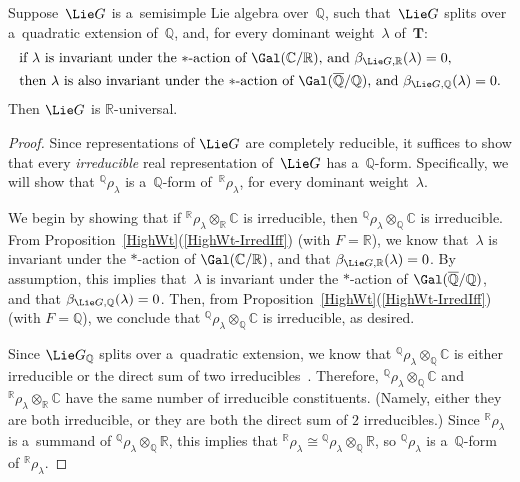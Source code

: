 \begin{cor}
Suppose~$\Lie G$ is a~semisimple Lie algebra over~$\mathbb{Q}$, such that~$\Lie G$ splits over a~quadratic
extension of~$\mathbb{Q}$, and, for every dominant weight~$\lambda$ of~$\mathbf{T}$:
\begin{gather}
\begin{split}
& \text{if~$\lambda$ is invariant under the $*$-action of~$\Gal(\mathbb{C}/\mathbb{R})$, and $\beta_{\Lie G,\mathbb{R}}(\lambda) = 0$,}
\\
& \text{then~$\lambda$ is also invariant under the $*$-action of $\Gal(\overline{\mathbb{Q}}/\mathbb{Q})$, and
$\beta_{\Lie G,\mathbb{Q}}(\lambda) = 0$.}
\end{split}\label{SplitOverQuadIff-weight}
\end{gather}
Then $\Lie G$ is $\mathbb{R}$-universal.
\end{cor}

\begin{proof}
Since representations of $\Lie G$ are completely reducible, it suf\/f\/ices to show that every \emph{irreducible} real
representation of~$\Lie G$ has a~$\mathbb{Q}$-form.
Specif\/ically, we will show that ${}^\mathbb{Q} \rho_\lambda$ is a~$\mathbb{Q}$-form of~${}^\mathbb{R} \rho_\lambda$, for
every dominant weight~$\lambda$.

We begin by showing that if ${}^\mathbb{R} \rho_\lambda \otimes_\mathbb{R} \mathbb{C}$ is irreducible, then
${}^\mathbb{Q} \rho_\lambda \otimes_\mathbb{Q} \mathbb{C}$ is irreducible.
From Proposition~\ref{HighWt}(\ref{HighWt-IrredIff}) (with $F = \mathbb{R}$), we know that~$\lambda$ is invariant under the $*$-action
of $\Gal(\mathbb{C}/\mathbb{R})$, and that $\beta_{\Lie G,\mathbb{R}}(\lambda) = 0$.
By assumption, this implies that~$\lambda$ is invariant under the $*$-action of\/
$\Gal(\overline{\mathbb{Q}}/\mathbb{Q})$, and that $\beta_{\Lie G,\mathbb{Q}}(\lambda) = 0$.
Then, from Proposition~\ref{HighWt}(\ref{HighWt-IrredIff}) (with $F = \mathbb{Q}$), we conclude that ${}^\mathbb{Q} \rho_\lambda
\otimes_\mathbb{Q} \mathbb{C}$ is irreducible, as desired.

Since $\Lie G_\mathbb{Q}$ splits over a~quadratic extension, we know that ${}^\mathbb{Q} \rho_\lambda \otimes_\mathbb{Q}
\mathbb{C}$ is either irreducible or the direct sum of two irreducibles~\cite[Corollary~3.2(2)]{Morris-RRepsQForms}.
Therefore, ${}^\mathbb{Q} \rho_\lambda \otimes_\mathbb{Q} \mathbb{C}$ and ${}^\mathbb{R} \rho_\lambda \otimes_\mathbb{R}
\mathbb{C}$ have the same number of irreducible constituents.
(Namely, either they are both irreducible, or they are both the direct sum of $2$ irreducibles.) Since ${}^\mathbb{R}
\rho_\lambda$ is a~summand of ${}^\mathbb{Q} \rho_\lambda \otimes_\mathbb{Q} \mathbb{R}$, this implies that
${}^\mathbb{R} \rho_\lambda \cong {}^\mathbb{Q} \rho_\lambda \otimes_\mathbb{Q} \mathbb{R}$, so ${}^\mathbb{Q}
\rho_\lambda$ is a~$\mathbb{Q}$-form of ${}^\mathbb{R} \rho_\lambda$.
\end{proof}

